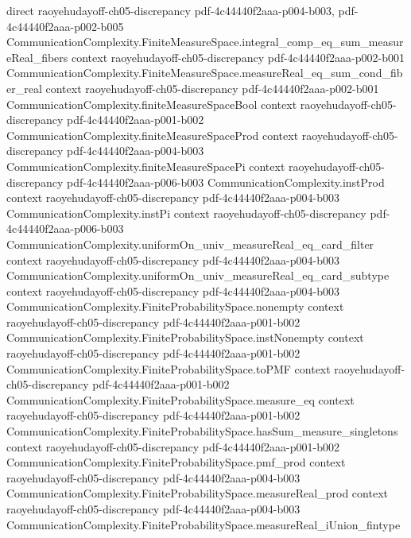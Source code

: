 \begin{lemma}
  {direct}
  {raoyehudayoff-ch05-discrepancy}
  {pdf-4c44440f2aaa-p004-b003,
    pdf-4c44440f2aaa-p002-b005}
\proofstep
  {CommunicationComplexity.FiniteMeasureSpace.integral_comp_eq_sum_measureReal_fibers}
  {context}
  {raoyehudayoff-ch05-discrepancy}
  {pdf-4c44440f2aaa-p002-b001}
\proofstep
  {CommunicationComplexity.FiniteMeasureSpace.measureReal_eq_sum_cond_fiber_real}
  {context}
  {raoyehudayoff-ch05-discrepancy}
  {pdf-4c44440f2aaa-p002-b001}
\proofstep
  {CommunicationComplexity.finiteMeasureSpaceBool}
  {context}
  {raoyehudayoff-ch05-discrepancy}
  {pdf-4c44440f2aaa-p001-b002}
\proofstep
  {CommunicationComplexity.finiteMeasureSpaceProd}
  {context}
  {raoyehudayoff-ch05-discrepancy}
  {pdf-4c44440f2aaa-p004-b003}
\proofstep
  {CommunicationComplexity.finiteMeasureSpacePi}
  {context}
  {raoyehudayoff-ch05-discrepancy}
  {pdf-4c44440f2aaa-p006-b003}
\proofstep
  {CommunicationComplexity.instProd}
  {context}
  {raoyehudayoff-ch05-discrepancy}
  {pdf-4c44440f2aaa-p004-b003}
\proofstep
  {CommunicationComplexity.instPi}
  {context}
  {raoyehudayoff-ch05-discrepancy}
  {pdf-4c44440f2aaa-p006-b003}
\proofstep
  {CommunicationComplexity.uniformOn_univ_measureReal_eq_card_filter}
  {context}
  {raoyehudayoff-ch05-discrepancy}
  {pdf-4c44440f2aaa-p004-b003}
\proofstep
  {CommunicationComplexity.uniformOn_univ_measureReal_eq_card_subtype}
  {context}
  {raoyehudayoff-ch05-discrepancy}
  {pdf-4c44440f2aaa-p004-b003}
\proofstep
  {CommunicationComplexity.FiniteProbabilitySpace.nonempty}
  {context}
  {raoyehudayoff-ch05-discrepancy}
  {pdf-4c44440f2aaa-p001-b002}
\proofstep
  {CommunicationComplexity.FiniteProbabilitySpace.instNonempty}
  {context}
  {raoyehudayoff-ch05-discrepancy}
  {pdf-4c44440f2aaa-p001-b002}
\proofstep
  {CommunicationComplexity.FiniteProbabilitySpace.toPMF}
  {context}
  {raoyehudayoff-ch05-discrepancy}
  {pdf-4c44440f2aaa-p001-b002}
\proofstep
  {CommunicationComplexity.FiniteProbabilitySpace.measure_eq}
  {context}
  {raoyehudayoff-ch05-discrepancy}
  {pdf-4c44440f2aaa-p001-b002}
\proofstep
  {CommunicationComplexity.FiniteProbabilitySpace.hasSum_measure_singletons}
  {context}
  {raoyehudayoff-ch05-discrepancy}
  {pdf-4c44440f2aaa-p001-b002}
\proofstep
  {CommunicationComplexity.FiniteProbabilitySpace.pmf_prod}
  {context}
  {raoyehudayoff-ch05-discrepancy}
  {pdf-4c44440f2aaa-p004-b003}
\proofstep
  {CommunicationComplexity.FiniteProbabilitySpace.measureReal_prod}
  {context}
  {raoyehudayoff-ch05-discrepancy}
  {pdf-4c44440f2aaa-p004-b003}
\proofstep
  {CommunicationComplexity.FiniteProbabilitySpace.measureReal_iUnion_fintype}

\end{lemma}
